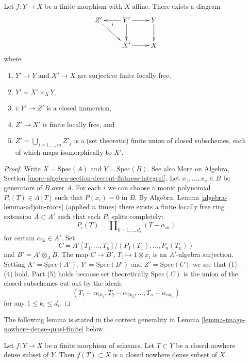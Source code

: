 \begin{lemma}
\label{lemma-massage-finite}
Let $f : Y \to X$ be a finite morphism with $X$ affine.
There exists a diagram
$$
\xymatrix{
Z' \ar[rd] &
Y' \ar[l]^i \ar[d] \ar[r] &
Y \ar[d] \\
 & X' \ar[r] & X
}
$$
where
\begin{enumerate}
\item $Y' \to Y$ and $X' \to X$ are surjective finite locally free,
\item $Y' = X' \times_X Y$,
\item $i : Y' \to Z'$ is a closed immersion,
\item $Z' \to X'$ is finite locally free, and
\item $Z' = \bigcup_{j = 1, \ldots, m} Z'_j$ is a (set theoretic)
finite union of closed subschemes, each of which maps isomorphically
to $X'$.
\end{enumerate}
\end{lemma}

\begin{proof}
Write $X = \text{Spec}(A)$ and $Y = \text{Spec}(B)$. See also
More on Algebra, Section \ref{more-algebra-section-descent-flatness-integral}.
Let $x_1, \ldots, x_n \in B$ be generators of $B$ over $A$.
For each $i$ we can choose a monic polynomial $P_i(T) \in A[T]$
such that $P(x_i) = 0$ in $B$. By
Algebra, Lemma \ref{algebra-lemma-adjoin-roots}
(applied $n$ times) there exists a finite locally free ring
extension $A \subset A'$ such that each $P_i$ splits completely:
$$
P_i(T) = \prod\nolimits_{k = 1, \ldots, d_i} (T - \alpha_{ik})
$$
for certain $\alpha_{ik} \in A'$. Set
$$
C = A'[T_1, \ldots, T_n]/(P_1(T_1), \ldots, P_n(T_n))
$$
and $B' = A' \otimes_A B$. The map $C \to B'$, $T_i \mapsto 1 \otimes x_i$
is an $A'$-algebra surjection. Setting $X' = \text{Spec}(A')$,
$Y' = \text{Spec}(B')$ and $Z' = \text{Spec}(C)$ we see that
(1) -- (4) hold. Part (5) holds because set theoretically
$\text{Spec}(C)$ is the union of the closed subschemes
cut out by the ideals
$$
(T_1 - \alpha_{1k_1}, T_2 - \alpha_{2k_2}, \ldots, T_n - \alpha_{nk_n})
$$
for any $1 \leq k_i \leq d_i$.
\end{proof}

\noindent
The following lemma is stated in the correct generality
in Lemma \ref{lemma-image-nowhere-dense-quasi-finite} below.

\begin{lemma}
\label{lemma-image-nowhere-dense-finite}
Let $f : Y \to X$ be a finite morphism of schemes.
Let $T \subset Y$ be a closed nowhere dense subset of $Y$.
Then $f(T) \subset X$ is a closed nowhere dense subset of $X$.
\end{lemma}

